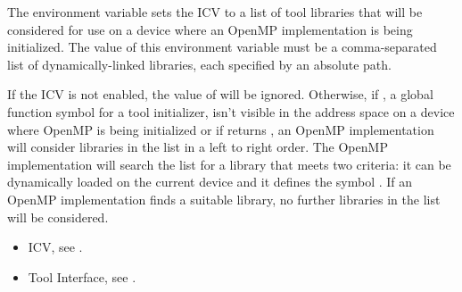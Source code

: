 The  environment variable sets the
 ICV to a list of tool libraries that will
be considered for use on a device where an OpenMP implementation
is being initialized.  The value of this environment variable must
be a comma-separated list of dynamically-linked libraries, each
specified by an absolute path. 

If the  ICV is not enabled, 
the value of  will be ignored.
Otherwise, if , a global function symbol for a tool initializer,
isn't visible in the address space on a device where OpenMP is being
initialized or if  returns , an OpenMP implementation 
will consider libraries in the  list 
in a left to right order.  The OpenMP implementation will search the list for 
a library that meets two criteria: it can be dynamically
loaded on the current device and it defines the symbol .
If an OpenMP implementation finds a suitable library, 
no further libraries in the list will be considered.

\crossreferences
\begin{itemize}
\item {} ICV, see .
\item Tool Interface, see .
\end{itemize}


